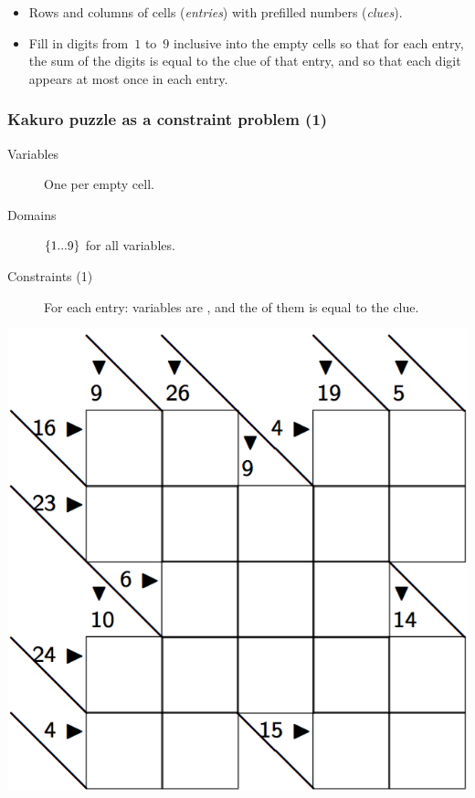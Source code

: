 \documentclass{beamer}
\newcommand{\stressed}[1]{\emph{{\color{red!50}{#1}}}}
\begin{document}
\begin{frame}
  \bigskip

  \begin{itemize}
    \item   Rows and columns of cells (\emph{entries}) with prefilled numbers (\emph{clues}).
    \item   Fill in digits from~$1$ to~$9$ inclusive into the empty cells so that
      for each entry, the sum of the digits is equal to the clue of that entry,
      and so that each digit appears at most once in each entry.
    \end{itemize}

\end{frame}

\begin{frame}
  \frametitle{Kakuro puzzle as a constraint problem (1)}
  \begin{minipage}{0.5\textwidth}
    \begin{description}
      \item[Variables] One per empty cell.
      \item[Domains] $\left\{1...9\right\}$ for all variables.
      \item[Constraints (1)] For each entry: variables are \stressed{distinct},
        and the \stressed{sum} of them is equal to the clue.
    \end{description} 
  \end{minipage}
  \begin{minipage}{0.45\textwidth}
    \includegraphics[scale=0.2]{kakuro.png}
  \end{minipage}
\end{frame}
\end{document}
